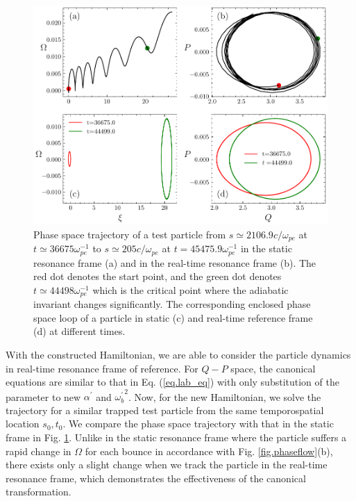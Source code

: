 \begin{figure}
    \centering
    \includegraphics[scale=0.5]{img/Trajectory.pdf}
    \caption{Phase space trajectory of a test particle from $s \simeq 2106.9 c/\omega_{pe}$ at $t\simeq 36675 \omega_{pe}^{-1}$ to $s \simeq 205 c/\omega_{pe}$ at $t=45475.9 \omega_{pe}^{-1}$  in the static resonance frame (a) and  in the real-time resonance frame (b). The red dot denotes the start point, and the green dot denotes $t \simeq 44498  \omega_{pe}^{-1}$ which is the critical point where the adiabatic invariant changes significantly. The corresponding enclosed phase space loop of a particle in static (c) and real-time reference frame (d) at different times.
    \label{fig.traj}
    }
\end{figure}

With the constructed Hamiltonian, we are able to consider the particle dynamics in real-time resonance frame of reference. For $Q-P$ space, the canonical equations are similar to that in Eq. (\ref{eq.lab_eq}) with only substitution of the parameter to new $\alpha^\prime$ and ${\omega^\prime_{b}}^2$.
Now, for the new Hamiltonian, we solve the trajectory for a similar trapped test particle from the same temporospatial location $s_0,t_0$. 
We compare the phase space trajectory with that in the static frame in Fig. \ref{fig.traj}.
Unlike in the static  resonance frame where the particle suffers a rapid change in $\Omega$ for each bounce in accordance with  Fig. \ref{fig.phaseflow}(b), there exists only a slight change when we track the particle in the real-time resonance frame, which demonstrates the effectiveness of the canonical transformation.


